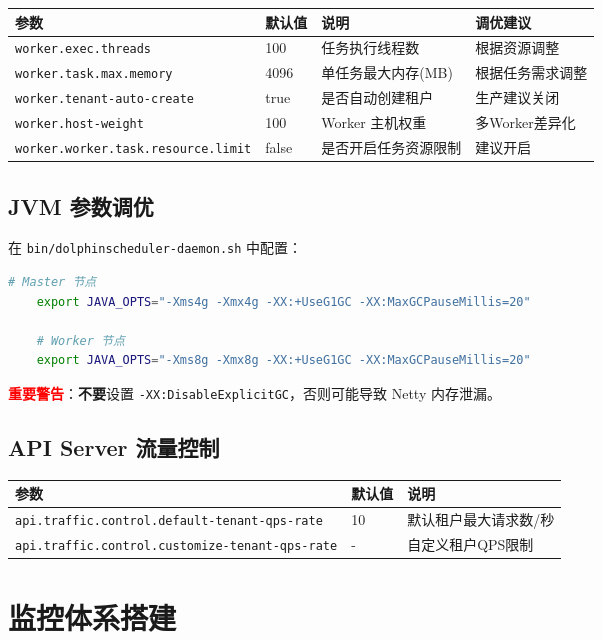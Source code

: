 \documentclass[UTF8, a4paper]{ctexbook}
\begin{document}
\begin{longtable}{p{5cm}p{3cm}p{5cm}p{3cm}}
	\toprule
	\textbf{参数} & \textbf{默认值} & \textbf{说明} & \textbf{调优建议} \\
	\midrule
	\texttt{worker.exec.threads} & 100 & 任务执行线程数 & 根据资源调整 \\
	\texttt{worker.task.max.memory} & 4096 & 单任务最大内存(MB) & 根据任务需求调整 \\
	\texttt{worker.tenant-auto-create} & true & 是否自动创建租户 & 生产建议关闭 \\
	\texttt{worker.host-weight} & 100 & Worker 主机权重 & 多Worker差异化 \\
	\texttt{worker.worker.task.resource.limit} & false & 是否开启任务资源限制 & 建议开启 \\
	\bottomrule
\end{longtable}
	
\section{JVM 参数调优}
	
在 \texttt{bin/dolphinscheduler-daemon.sh} 中配置：
	
\begin{lstlisting}[language=bash]
	# Master 节点
	export JAVA_OPTS="-Xms4g -Xmx4g -XX:+UseG1GC -XX:MaxGCPauseMillis=20"
	
	# Worker 节点
	export JAVA_OPTS="-Xms8g -Xmx8g -XX:+UseG1GC -XX:MaxGCPauseMillis=20"
\end{lstlisting}
	
\textbf{\textcolor{red}{重要警告}}：\textbf{不要}设置 \texttt{-XX:DisableExplicitGC}，否则可能导致 Netty 内存泄漏。
	
\section{API Server 流量控制}
	
\begin{longtable}{p{5cm}p{3cm}p{5cm}}
	\toprule
	\textbf{参数} & \textbf{默认值} & \textbf{说明} \\
	\midrule
	\texttt{api.traffic.control.default-tenant-qps-rate} & 10 & 默认租户最大请求数/秒 \\
	\texttt{api.traffic.control.customize-tenant-qps-rate} & - & 自定义租户QPS限制 \\
	\bottomrule
\end{longtable}
	
\chapter{监控体系搭建}
	
\end{document}
